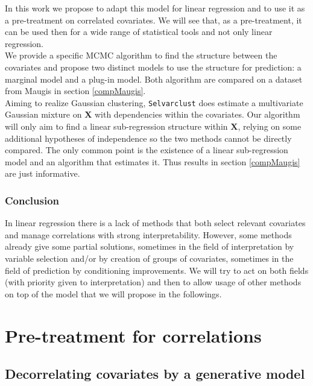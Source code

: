 \documentclass[12pt,a4paper]{report}
\begin{document}
			In this work we propose to adapt this model for linear regression and to use it as a pre-treatment on correlated covariates. We will see that, as a pre-treatment, it can be used then for a wide range of statistical tools and not only linear regression.\\
			We provide a specific MCMC algorithm to find the structure between the covariates and propose two distinct models to use the structure for prediction: a marginal model and a plug-in model. Both algorithm are compared on a dataset from Maugis in section \ref{compMaugis}.	\\
			
			Aiming to realize Gaussian clustering, {\tt Selvarclust} does estimate a multivariate Gaussian mixture on $\boldsymbol{X}$ with dependencies within the covariates. Our algorithm will only aim to find a linear sub-regression structure within $\boldsymbol{X}$, relying on some additional hypotheses of independence so the two methods cannot be directly compared. The only common point is the existence of a linear sub-regression model and an algorithm that estimates it. Thus results in section \ref{compMaugis} are just informative.
	
\section{Conclusion} In linear regression there is a lack of methods that both select relevant covariates and manage correlations with strong interpretability. However, some methods already give some partial solutions, sometimes in the field of interpretation by variable selection and/or by creation of groups of covariates, sometimes in the field of prediction by conditioning improvements. We will try to act on both fields (with priority given to interpretation) and then to allow usage of other methods on top of the model that we will propose in the followings.	
			
\part{Pre-treatment for correlations}
\chapter{Decorrelating covariates by a generative model}\label{chapexpl}
\end{document}
